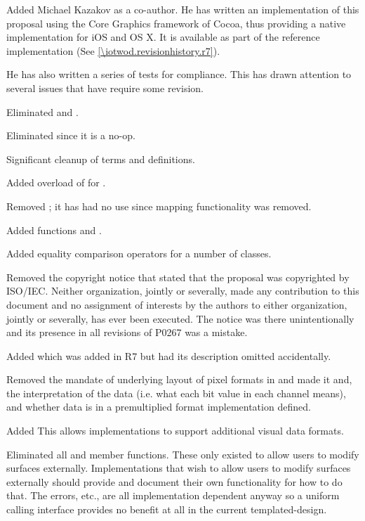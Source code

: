 \pnum
Added Michael Kazakov as a co-author. He has written an implementation of this proposal using the Core Graphics framework of Cocoa\textregistered{}, thus providing a native implementation for iOS\textregistered{} and OS X\textregistered{}. It is available as part of the reference implementation (See \ref{\iotwod.revisionhistory.r7}).

\pnum
He has also written a series of tests for compliance. This has drawn attention to several issues that have require some revision.

\pnum
Eliminated  and .

\pnum
Eliminated  since it is a no-op.

\pnum
Significant cleanup of terms and definitions.

\pnum
Added overload of  for .

\pnum
Removed ; it has had no use since mapping functionality was removed.

\pnum
Added functions  and .

\pnum
Added equality comparison operators for a number of classes.

\pnum
Removed the copyright notice that stated that the proposal was copyrighted by ISO/IEC. Neither organization, jointly or severally, made any contribution to this document and no assignment of interests by the authors to either organization, jointly or severally, has ever been executed. The notice was there unintentionally and its presence in all revisions of P0267 was a mistake.

\pnum
Added  which was added in R7 but had its description omitted accidentally.

\pnum
Removed the mandate of underlying layout of pixel formats in  and made it and, the interpretation of the data (i.e. what each bit value in each channel means), and whether data is in a premultiplied format implementation defined.

\pnum
Added  This allows implementations to support additional visual data formats.

\pnum
Eliminated all  and  member functions. These only existed to allow users to modify surfaces externally. Implementations that wish to allow users to modify surfaces externally should provide and document their own functionality for how to do that. The errors, etc., are all implementation dependent anyway so a uniform calling interface provides no benefit at all in the current templated-design.

